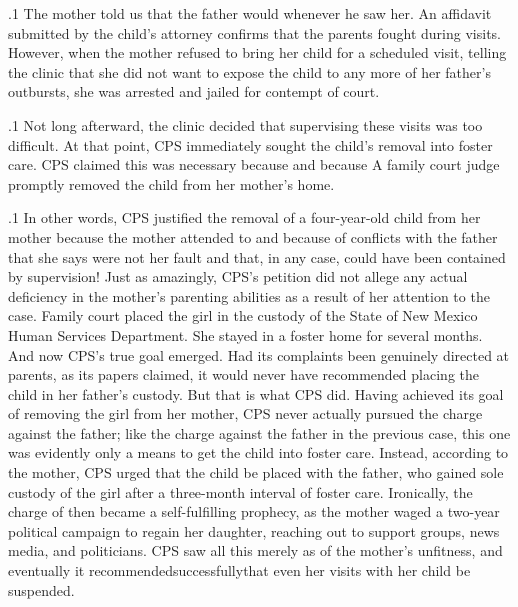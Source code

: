 \documentclass[11pt, twoside]{article}
\begin{document}
{\p.1{%
The mother told us that the father would  whenever he saw her.
An affidavit submitted by the child's attorney confirms that the parents
fought during visits. However, when the mother refused to bring her
child for a scheduled visit, telling the clinic that she did not want to
expose the child to any more of her father's outbursts, she was arrested
and jailed for contempt of court.
}%

\p.1{%
Not long afterward, the clinic decided that supervising these visits
was too difficult. At that point, CPS immediately sought the child's removal into foster care. CPS claimed this was necessary because  and because  A family court judge promptly removed the child from
her mother's home.
}%

\p.1{%
In other words, CPS justified the removal of a four-year-old child
from her mother because the mother attended to  and
because of conflicts with the father that she says were not her fault
and that, in any case, could have been contained by supervision! Just
as amazingly, CPS's petition did not allege any actual deficiency in the
mother's parenting abilities as a result of her attention to the case.
Family court placed the girl in the custody of the State of New
Mexico Human Services Department. She stayed in a foster home for
several months. And now CPS's true goal emerged. Had its complaints
been genuinely directed at  parents, as its papers claimed, it would
never have recommended placing the child in her father's custody.
But that is what CPS did. Having achieved its goal of removing the
girl from her mother, CPS never actually pursued the charge against
the father; like the charge against the father in the previous case, this
one was evidently only a means to get the child into foster care. Instead,
according to the mother, CPS urged that the child be placed with the
father, who gained sole custody of the girl after a three-month interval
of foster care. Ironically, the charge of 
then became a self-fulfilling prophecy, as the mother waged a two-year political campaign
to regain her daughter, reaching out to support groups, news media, and
politicians. CPS saw all this merely as  of the mother's unfitness,
and eventually it recommended\mdash{}successfully\mdash{}that even her visits with
her child be suspended.
}%

}
\end{document}
